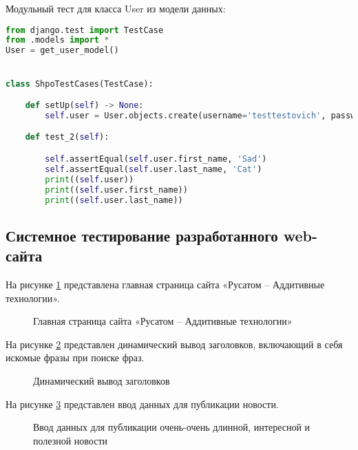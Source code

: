 Модульный тест для класса User из модели данных:

\begin{lstlisting}[language=Python]
from django.test import TestCase
from .models import *
User = get_user_model()


class ShpoTestCases(TestCase):

    def setUp(self) -> None:
        self.user = User.objects.create(username='testtestovich', password='testtestovich', first_name='Sad', last_name='')

    def test_2(self):

        self.assertEqual(self.user.first_name, 'Sad')
        self.assertEqual(self.user.last_name, 'Cat')
        print((self.user))
        print((self.user.first_name))
        print((self.user.last_name))
\end{lstlisting}

\subsection{Системное тестирование разработанного web-сайта}

На рисунке \ref{main:image} представлена главная страница сайта «Русатом – Аддитивные технологии».

\begin{figure}
\caption{Главная страница сайта «Русатом – Аддитивные технологии»}
\label{main:image}
\end{figure}

На рисунке \ref{menu:image} представлен динамический вывод заголовков, включающий в себя искомые фразы при поиске фраз.

\begin{figure}
\caption{Динамический вывод заголовков}
\label{menu:image}
\end{figure}

На рисунке \ref{enter:image} представлен ввод данных для публикации новости.

\begin{figure}
\caption{Ввод данных для публикации очень-очень длинной, интересной и полезной новости}
\label{enter:image}
\end{figure}
